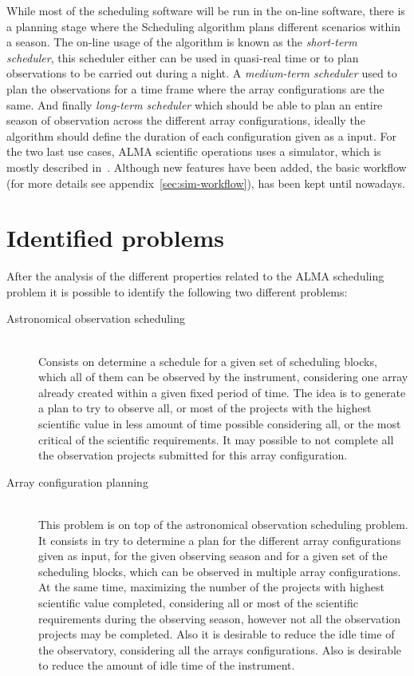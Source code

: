 While most of the scheduling software will be run in the on-line software, there is a planning stage where the Scheduling algorithm plans different scenarios within a season. The on-line usage of the algorithm is known as the \textit{short-term scheduler}, this scheduler either can be used in quasi-real time or to plan observations to be carried out during a night. A \textit{medium-term scheduler} used to plan the observations for a time frame where the array configurations are the same. And finally \textit{long-term scheduler} which should be able to plan an entire season of observation across the different array configurations, ideally the algorithm should define the duration of each configuration given as a input. For the two last use cases, ALMA scientific operations uses a simulator, which is mostly described in~\cite{hoffstadt10}. Although new features have been added, the basic workflow (for more details see appendix~\ref{sec:sim-workflow}), has been kept until nowadays.

\section{Identified problems}
\label{sec:problems}
After the analysis of the different properties related to the ALMA scheduling problem it is possible to identify the following two different problems:

\begin{description}
\item[Astronomical observation scheduling] \hfill \\
Consists on determine a schedule for a given set of scheduling blocks, which all of them can be observed by the instrument, considering one array already created within a given fixed period of time. 
The idea is to generate a plan to try to observe all, or most of the projects with the highest scientific value in less amount of time possible considering all, or the most critical of the scientific requirements. It may possible to not complete all the observation projects submitted for this array configuration.

\item[Array configuration planning] \hfill \\
This problem is on top of the astronomical observation scheduling problem. It consists in try to determine a plan for the different array configurations given as input, for the given observing season and for a given set of the scheduling blocks, which can be observed in multiple array configurations. At the same time, maximizing the number of the projects with highest scientific value completed, considering all or most of the scientific requirements during the observing season, however not all the observation projects may be completed. Also it is desirable to reduce the idle time of the observatory, considering all the arrays configurations. Also is desirable to reduce the amount of idle time of the instrument.
\end{description}